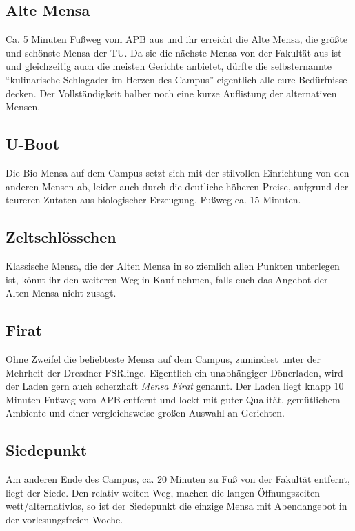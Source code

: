\subsection*{Alte Mensa}
Ca. 5 Minuten Fußweg vom APB aus und ihr erreicht die Alte Mensa, die größte und schönste Mensa der TU\@.
Da sie die nächste Mensa von der Fakultät aus ist und gleichzeitig auch die meisten Gerichte anbietet, dürfte die selbsternannte \enquote{kulinarische Schlagader im Herzen des Campus} eigentlich alle eure Bedürfnisse decken.
Der Vollständigkeit halber noch eine kurze Auflistung der alternativen Mensen.

\subsection*{U-Boot}
Die Bio-Mensa auf dem Campus setzt sich mit der stilvollen Einrichtung von den anderen Mensen ab, leider auch durch die deutliche höheren Preise, aufgrund der teureren Zutaten aus biologischer Erzeugung.
Fußweg ca. 15 Minuten.

\subsection*{Zeltschlösschen}
Klassische Mensa, die der Alten Mensa in so ziemlich allen Punkten unterlegen ist, könnt ihr den weiteren Weg in Kauf nehmen, falls euch das Angebot der Alten Mensa nicht zusagt.

\subsection*{Firat}
Ohne Zweifel die beliebteste Mensa auf dem Campus, zumindest unter der Mehrheit der Dresdner FSRlinge.
Eigentlich ein unabhängiger Dönerladen, wird der Laden gern auch scherzhaft \emph{Mensa Firat} genannt.
Der Laden liegt knapp 10 Minuten Fußweg vom APB entfernt und lockt mit guter Qualität, gemütlichem Ambiente und einer vergleichsweise großen Auswahl an Gerichten.

\subsection*{Siedepunkt}
Am anderen Ende des Campus, ca. 20 Minuten zu Fuß von der Fakultät entfernt, liegt der Siede.
Den relativ weiten Weg, machen die langen Öffnungszeiten wett/alternativlos, so ist der Siedepunkt die einzige Mensa mit Abendangebot in der vorlesungsfreien Woche.

